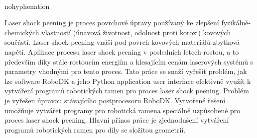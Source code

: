 ﻿%
﻿
\begin{hyphenrules}{nohyphenation}

Laser shock peening je proces povrchové úpravy používaný ke zlepšení  fyzikálně-chemických vlastností (únavová životnost, odolnost proti korozi) kovových součástí. Laser shock peening vnáší pod povrch kovových materiálů zbytková napětí. Aplikace procesu laser shock peening v posledních letech rostou, a to především díky stále rostoucím energiím a klesajícím cenám laserových systémů s parametry vhodnými pro tento proces. Tato práce se snaží vyřešit problém, jak lze software RoboDK a jeho Python application user interface efektivně využít k vytváření programů robotických ramen pro proces laser shock peening. Problém je vyřešen úpravou stávajícího postprocesoru RoboDK. Vytvořené řešení umožňuje vytvářet programy pro robotická ramena speciálně uzpůsobené pro proces laser shock peening. Hlavní přínos práce je zjednodušení vytváření programů robotických ramen pro díly se složitou geometrií. 

\end{hyphenrules}

